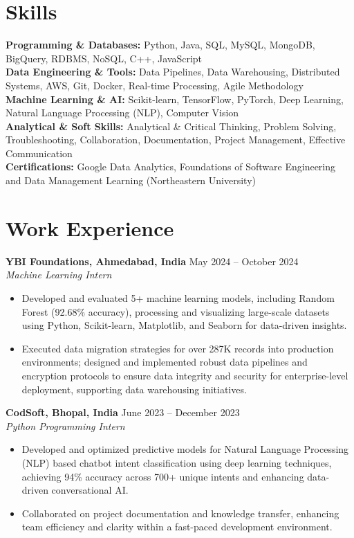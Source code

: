 \documentclass[a4paper,10pt]{article}
\begin{document}
\section*{Skills}
\textbf{Programming \& Databases: } Python, Java, SQL, MySQL, MongoDB, BigQuery, RDBMS, NoSQL, C++, JavaScript \\
\textbf{Data Engineering \& Tools:} Data Pipelines, Data Warehousing, Distributed Systems, AWS, Git, Docker, Real-time Processing, Agile Methodology \\
\textbf{Machine Learning \& AI: } Scikit-learn, TensorFlow, PyTorch, Deep Learning, Natural Language Processing (NLP), Computer Vision \\
\textbf{Analytical \& Soft Skills: } Analytical \& Critical Thinking, Problem Solving, Troubleshooting, Collaboration, Documentation, Project Management, Effective Communication \\
\textbf{Certifications:} Google Data Analytics, Foundations of Software Engineering and Data Management Learning (Northeastern University) \\

\vspace{-4mm}

\section*{Work Experience}
\textbf{YBI Foundations, Ahmedabad, India} \hfill May 2024 -- October 2024\\
\textit{Machine Learning Intern} \\
\begin{itemize}[leftmargin=*, itemsep=0pt, parsep=1pt]
\vspace{-6mm}
\item Developed and evaluated 5+ machine learning models, including Random Forest (92.68\% accuracy), processing and visualizing large-scale datasets using Python, Scikit-learn, Matplotlib, and Seaborn for data-driven insights.
\item Executed data migration strategies for over 287K records into production environments; designed and implemented robust data pipelines and encryption protocols to ensure data integrity and security for enterprise-level deployment, supporting data warehousing initiatives.
\end{itemize}
\textbf{CodSoft, Bhopal, India} \hfill June 2023 -- December 2023\\
\textit{Python Programming Intern} \\
\begin{itemize}[leftmargin=*, itemsep=0pt, parsep=1pt]
\vspace{-6mm}
\item Developed and optimized predictive models for Natural Language Processing (NLP) based chatbot intent classification using deep learning techniques, achieving 94\% accuracy across 700+ unique intents and enhancing data-driven conversational AI.
\item Collaborated on project documentation and knowledge transfer, enhancing team efficiency and clarity within a fast-paced development environment.
\vspace{-1mm}
\end{itemize}
\end{document}
